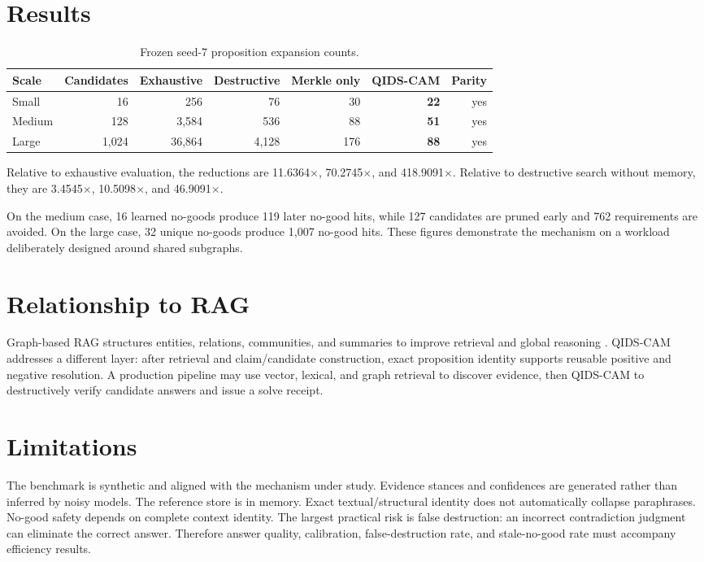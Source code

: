 \documentclass[11pt]{article}
\begin{document}
\section{Results}
\begin{table}[h]
\centering
\caption{Frozen seed-7 proposition expansion counts.}
\begin{tabular}{lrrrrrr}
\toprule
Scale & Candidates & Exhaustive & Destructive & Merkle only & QIDS-CAM & Parity \\
\midrule
Small  & 16    & 256    & 76    & 30  & \textbf{22} & yes \\
Medium & 128   & 3,584  & 536   & 88  & \textbf{51} & yes \\
Large  & 1,024 & 36,864 & 4,128 & 176 & \textbf{88} & yes \\
\bottomrule
\end{tabular}
\end{table}

Relative to exhaustive evaluation, the reductions are 11.6364$\times$, 70.2745$\times$, and 418.9091$\times$. Relative to destructive search without memory, they are 3.4545$\times$, 10.5098$\times$, and 46.9091$\times$.

On the medium case, 16 learned no-goods produce 119 later no-good hits, while 127 candidates are pruned early and 762 requirements are avoided. On the large case, 32 unique no-goods produce 1,007 no-good hits. These figures demonstrate the mechanism on a workload deliberately designed around shared subgraphs.

\section{Relationship to RAG}
Graph-based RAG structures entities, relations, communities, and summaries to improve retrieval and global reasoning \cite{edge2024graphrag}. QIDS-CAM addresses a different layer: after retrieval and claim/candidate construction, exact proposition identity supports reusable positive and negative resolution. A production pipeline may use vector, lexical, and graph retrieval to discover evidence, then QIDS-CAM to destructively verify candidate answers and issue a solve receipt.

\section{Limitations}
The benchmark is synthetic and aligned with the mechanism under study. Evidence stances and confidences are generated rather than inferred by noisy models. The reference store is in memory. Exact textual/structural identity does not automatically collapse paraphrases. No-good safety depends on complete context identity. The largest practical risk is false destruction: an incorrect contradiction judgment can eliminate the correct answer. Therefore answer quality, calibration, false-destruction rate, and stale-no-good rate must accompany efficiency results.
\end{document}
